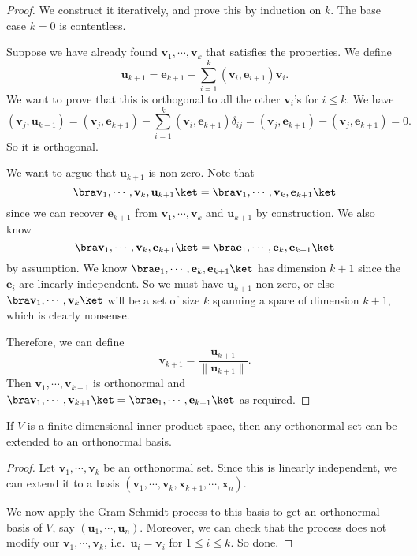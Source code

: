 \documentclass[a4paper]{article}
\begin{document}
\begin{proof}
  We construct it iteratively, and prove this by induction on $k$. The base case $k = 0$ is contentless.

  Suppose we have already found $\mathbf{v}_1, \cdots, \mathbf{v}_k$ that satisfies the properties. We define
  \[
    \mathbf{u}_{k + 1} = \mathbf{e}_{k + 1} - \sum_{i = 1}^k (\mathbf{v}_i, \mathbf{e}_{i + 1}) \mathbf{v}_i.
  \]
  We want to prove that this is orthogonal to all the other $\mathbf{v}_i$'s for $i \leq k$. We have
  \[
    (\mathbf{v}_j, \mathbf{u}_{k + 1}) = (\mathbf{v}_j, \mathbf{e}_{k + 1}) - \sum_{i = 1}^k (\mathbf{v}_i, \mathbf{e}_{k + 1}) \delta_{ij} = (\mathbf{v}_j, \mathbf{e}_{k + 1}) - (\mathbf{v}_j, \mathbf{e}_{k + 1}) = 0.
  \]
  So it is orthogonal.

  We want to argue that $\mathbf{u}_{k + 1}$ is non-zero. Note that
  \[
    \bra \mathbf{v}_1, \cdots, \mathbf{v}_k, \mathbf{u}_{k + 1}\ket = \bra \mathbf{v}_1, \cdots, \mathbf{v}_k, \mathbf{e}_{k + 1}\ket
  \]
  since we can recover $\mathbf{e}_{k + 1}$ from $\mathbf{v}_1, \cdots, \mathbf{v}_k$ and $\mathbf{u}_{k + 1}$ by construction. We also know
  \[
    \bra \mathbf{v}_1, \cdots, \mathbf{v}_k, \mathbf{e}_{k + 1}\ket = \bra \mathbf{e}_1, \cdots, \mathbf{e}_k, \mathbf{e}_{k + 1}\ket
  \]
  by assumption. We know $\bra \mathbf{e}_1, \cdots, \mathbf{e}_k, \mathbf{e}_{k + 1}\ket$ has dimension $k + 1$ since the $\mathbf{e}_i$ are linearly independent. So we must have $\mathbf{u}_{k + 1}$ non-zero, or else $\bra \mathbf{v}_1, \cdots, \mathbf{v}_k\ket$ will be a set of size $k$ spanning a space of dimension $k + 1$, which is clearly nonsense.

  Therefore, we can define
  \[
    \mathbf{v}_{k + 1} = \frac{\mathbf{u}_{k + 1}}{\|\mathbf{u}_{k + 1}\|}.
  \]
  Then $\mathbf{v}_1, \cdots, \mathbf{v}_{k + 1}$ is orthonormal and $\bra \mathbf{v}_1, \cdots, \mathbf{v}_{k + 1}\ket = \bra \mathbf{e}_1, \cdots, \mathbf{e}_{k + 1}\ket$ as required.
\end{proof}

\begin{cor}
  If $V$ is a finite-dimensional inner product space, then any orthonormal set can be extended to an orthonormal basis.
\end{cor}

\begin{proof}
  Let $\mathbf{v}_1, \cdots, \mathbf{v}_k$ be an orthonormal set. Since this is linearly independent, we can extend it to a basis $(\mathbf{v}_1,\cdots, \mathbf{v}_k, \mathbf{x}_{k + 1}, \cdots, \mathbf{x}_n)$.

  We now apply the Gram-Schmidt process to this basis to get an orthonormal basis of $V$, say $(\mathbf{u}_1, \cdots, \mathbf{u}_n)$. Moreover, we can check that the process does not modify our $\mathbf{v}_1, \cdots, \mathbf{v}_k$, i.e.\ $\mathbf{u}_i = \mathbf{v}_i$ for $1 \leq i \leq k$. So done.
\end{proof}
\end{document}
